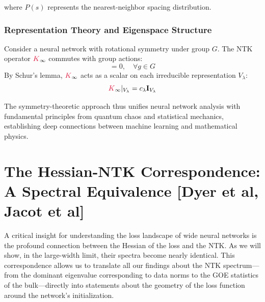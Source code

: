\documentclass[a4paper]{article}
\theoremstyle{plain}
\theoremstyle{definition}
\theoremstyle{remark}
\begin{document}
where $P(s)$ represents the nearest-neighbor spacing distribution.

\subsubsection{Representation Theory and Eigenspace Structure}

\begin{tcolorbox}[colback=green!10,colframe=green!60!black,title={\textbf{🎯 THEOREM: Schur-Weyl Duality for NTK}},enhanced,drop shadow]
Consider a neural network with rotational symmetry under group $G$. The NTK operator $\textcolor{kernelcolor}{K}_\infty$ commutes with group actions:
\begin{equation}
[\textcolor{kernelcolor}{K}_\infty, \textcolor{orange!80!black}{R_g}] = 0, \quad \forall g \in G
\end{equation}
By Schur's lemma, $\textcolor{kernelcolor}{K}_\infty$ acts as a scalar on each irreducible representation $V_\lambda$:
\begin{equation}
\textcolor{kernelcolor}{K}_\infty|_{V_\lambda} = c_\lambda \mathbf{I}_{V_\lambda}
\end{equation}
\end{tcolorbox}


The symmetry-theoretic approach thus unifies neural network analysis with fundamental principles from quantum chaos and statistical mechanics, establishing deep connections between machine learning and mathematical physics.


\section{The Hessian-NTK Correspondence: A Spectral Equivalence [Dyer et al, Jacot et al]}

A critical insight for understanding the loss landscape of wide neural networks is the profound connection between the Hessian of the loss and the NTK. As we will show, in the large-width limit, their spectra become nearly identical. This correspondence allows us to translate all our findings about the NTK spectrum—from the dominant eigenvalue corresponding to data norms to the GOE statistics of the bulk—directly into statements about the geometry of the loss function around the network's initialization.
\end{document}
